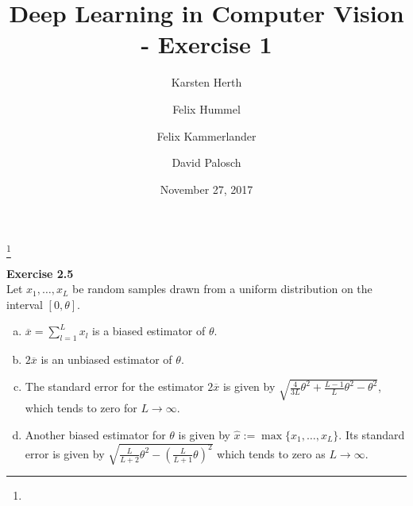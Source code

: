 \documentclass[a4paper, reqno]{amsart}
\theoremstyle{definition}
\numberwithin{equation}{section}
\begin{document}
\title[Exercise 1]
{Deep Learning in Computer Vision - Exercise 1}
\author{Karsten Herth}
\author{Felix Hummel}
\author{Felix Kammerlander}
\author{David Palosch}
\thanks{}
\date{November 27, 2017}

\maketitle

{\bf Exercise 2.5} \\
Let $x_1, \ldots, x_L$ be random samples drawn from a uniform distribution on the interval $[0, \theta].$
\begin{enumerate}
[(a)]
	\item $\overline x = \sum_{l=1}^L x_l$ is a biased estimator of $\theta.$
	\item $2\overline x$ is an unbiased estimator of $\theta.$
	\item The standard error for the estimator $2\overline x$ is given by 
		$\sqrt{\frac{4}{3L}\theta^2 + \frac{L-1}{L}\theta^2 - \theta^2}$, which tends to zero for $L \to \infty.$
	\item Another biased estimator for $\theta$ is given by $\hat x := \max\{ x_1, \ldots, x_L\}.$ Its standard error is given by
		$\sqrt{\frac{L}{L+2}\theta^2 - \left(\frac{L}{L+1}\theta \right)^2}$ which tends to zero as $L \to \infty.$
\end{enumerate}
\end{document}
